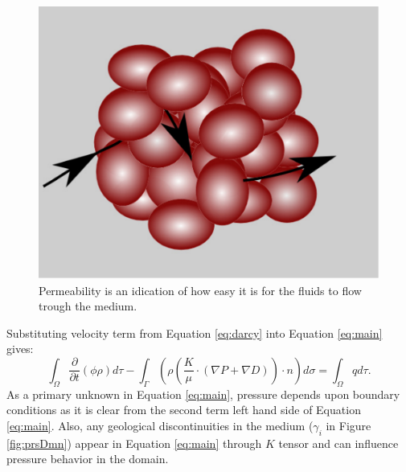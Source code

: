 \begin{figure}
 \centering{}
 \includegraphics[width=0.35\linewidth]{./figurer/singlePerm}
 \caption{Permeability is an idication of how easy it is for the fluids to flow
trough the medium.}
 \label{fig:snglK}
\end{figure}

Substituting velocity term from Equation \ref{eq:darcy} into Equation
\ref{eq:main} gives:
\begin{equation}
  \int_{\Omega}\frac{\partial}{\partial t}(\phi\rho)d\tau-\int_{\Gamma}(\rho
(\frac{K}{\mu}\cdot (\nabla{P}+\nabla{D})) \cdot n)d\sigma=\int_{\Omega}qd\tau.
  \label{eq:main}
\end{equation} As a primary unknown in Equation \ref{eq:main}, pressure depends
upon boundary conditions as it is clear from the second term left hand side of
Equation \ref{eq:main}. Also, any geological discontinuities in the medium
($\gamma_i$ in Figure \ref{fig:prsDmn}) appear in Equation \ref{eq:main} through
$K$ tensor and can influence pressure behavior in the domain.

